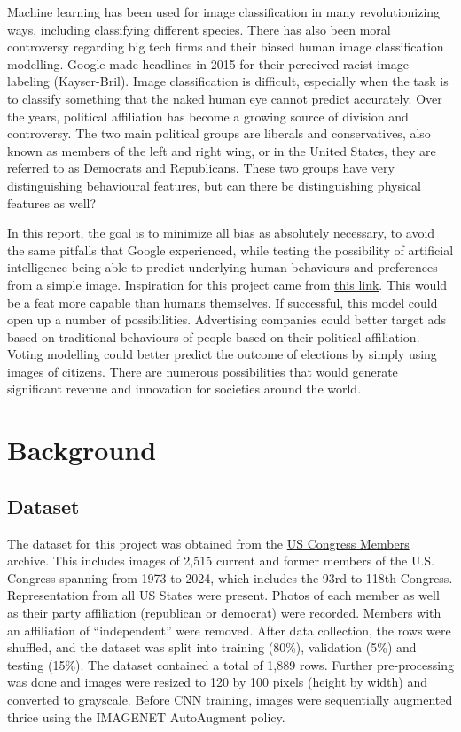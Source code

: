 \documentclass[manuscript,screen,review]{acmart}
\begin{document}
Machine learning has been used for image classification in many revolutionizing ways, including classifying different species. There has also been moral controversy regarding big tech firms and their biased human image classification modelling. Google made headlines in 2015 for their perceived racist image labeling (Kayser-Bril). Image classification is difficult, especially when the task is to classify something that the naked human eye cannot predict accurately. Over the years, political affiliation has become a growing source of division and controversy. The two main political groups are liberals and conservatives, also known as members of the left and right wing, or in the United States, they are referred to as Democrats and Republicans. These two groups have very distinguishing behavioural features, but can there be distinguishing physical features as well?
\par
In this report, the goal is to minimize all bias as absolutely necessary, to avoid the same pitfalls that Google experienced, while testing the possibility of artificial intelligence being able to predict underlying human behaviours and preferences from a simple image. Inspiration for this project came from \href{ttps://www.nature.com/articles/s41598-020-79310-1 }{this link}. This would be a feat more capable than humans themselves. If successful, this model could open up a number of possibilities. Advertising companies could better target ads based on traditional behaviours of people based on their political affiliation. Voting modelling could better predict the outcome of elections by simply using images of citizens. There are numerous possibilities that would generate significant revenue and innovation for societies around the world.

\section{Background}

\subsection{Dataset}

The dataset for this project was obtained from the \href{https://www.congress.gov/members}{US Congress Members} archive. This includes images of 2,515 current and former members of the U.S. Congress spanning from 1973 to 2024, which includes the 93rd to 118th Congress. Representation from all US States were present. Photos of each member as well as their party affiliation (republican or democrat) were recorded. Members with an affiliation of ``independent'' were removed. After data collection, the rows were shuffled, and the dataset was split into training (80\%), validation (5\%) and testing (15\%). The dataset contained a total of 1,889 rows. Further pre-processing was done and images were resized to 120 by 100 pixels (height by width) and converted to grayscale. Before CNN training, images were sequentially augmented thrice using the IMAGENET AutoAugment policy. 
\end{document}
